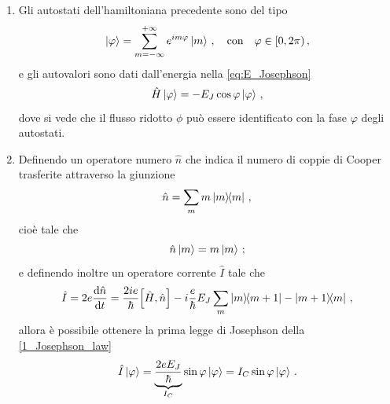 \begin{enumerate}
    \item Gli autostati dell'hamiltoniana precedente sono del tipo
    \begin{equation*}
        \ket{\varphi}=\sum_{m=-\infty}^{+\infty}e^{im\varphi}\ket{m} \, , \quad \text{con} \quad \varphi \in [0,2\pi) \, ,
    \end{equation*}
    e gli autovalori sono dati dall'energia nella \eqref{eq:E_Josephson} 
    \begin{equation*}
        \hat H \ket{\varphi} = -E_J \cos\varphi\ket{\varphi} \, ,
    \end{equation*}
    dove si vede che il flusso ridotto $\phi$ pu\`o essere identificato con la fase $\varphi$ degli autostati.
    \item Definendo un operatore numero $\hat n$ che indica il numero di coppie di Cooper trasferite attraverso la giunzione
    \begin{equation*}
        \hat n = \sum_m m\op{m}{m} \, ,
    \end{equation*}
    cioè tale che
    \begin{equation*}
        \hat n \ket m = m \ket m \, ;
    \end{equation*}
    e definendo inoltre un operatore corrente $\hat{I}$ tale che
    \begin{equation*}
        \hat{I} = 2 e \dv{\hat{n}}{t} = \frac{2 i e}{\hbar} \comm{\hat{H}}{\hat{n}} -i\frac{e}{\hbar}E_J\sum_m\op{m}{m+1}-\op{m+1}{m} \, ,
    \end{equation*}
    allora è possibile ottenere la prima legge di Josephson della \eqref{1_Josephson_law}
    \begin{equation*}
        \hat I \ket{\varphi} = \underbrace{\frac{2eE_J}{\hbar}}_{I_C} \sin\varphi \ket\varphi = I_C \sin\varphi \ket{\varphi} \, .
    \end{equation*}
    

\end{enumerate}
